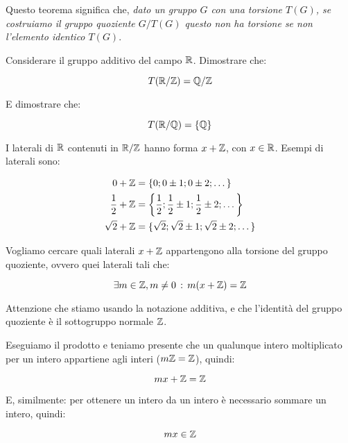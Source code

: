 Questo teorema significa che, \emph{dato un gruppo $G$ con una torsione $T(G)$, se costruiamo il gruppo quoziente $G/T(G)$ questo non ha torsione se non l'elemento identico $T(G)$}. 

\begin{esercizio}
	Considerare il gruppo additivo del campo $\mathbb{R}$. Dimostrare che:
	
	\begin{equation}
		T(\mathbb{R}/\mathbb{Z}) = \mathbb{Q}/\mathbb{Z}
	\end{equation}
	
	E dimostrare che:
	
	\begin{equation}
		T(\mathbb{R}/\mathbb{Q}) = \{\mathbb{Q}\}
	\end{equation}
\end{esercizio}
\begin{soluzione}
	I laterali di $\mathbb{R}$ contenuti in $\mathbb{R}/\mathbb{Z}$ hanno forma $x + \mathbb{Z}$, con $x \in \mathbb{R}$. Esempi di laterali sono:
	
	\begin{align}
		0 + \mathbb{Z} &= \{0; 0 \pm 1; 0 \pm 2; \dots\} \\
		\frac{1}{2} + \mathbb{Z} &= \biggl\{\frac{1}{2}; \frac{1}{2} \pm 1; \frac{1}{2} \pm 2; \dots \biggr\} \\
		\sqrt{2} + \mathbb{Z} &= \{\sqrt{2}; \sqrt{2} \pm 1; \sqrt{2} \pm 2; \dots \}
	\end{align}

	Vogliamo cercare quali laterali $x + \mathbb{Z}$ appartengono alla torsione del gruppo quoziente, ovvero quei laterali tali che:
	
	\begin{equation}
		\exists m \in \mathbb{Z}, m \ne 0 \,:\, m(x + \mathbb{Z}) = \mathbb{Z}
	\end{equation}

	Attenzione che stiamo usando la notazione additiva, e che l'identità del gruppo quoziente è il sottogruppo normale $\mathbb{Z}$.
	
	Eseguiamo il prodotto e teniamo presente che un qualunque intero moltiplicato per un intero appartiene agli interi ($m\mathbb{Z} = \mathbb{Z}$), quindi:
	
	\begin{equation}
		mx + \mathbb{Z} = \mathbb{Z}
	\end{equation}

	E, similmente: per ottenere un intero da un intero è necessario sommare un intero, quindi:
	
	\begin{equation}
		mx \in \mathbb{Z}
	\end{equation}


\end{soluzione}
